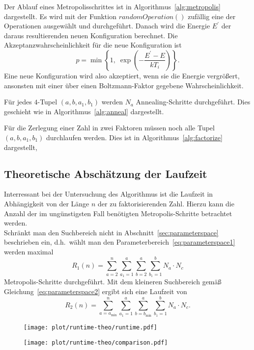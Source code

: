 Der Ablauf eines Metropolisschrittes ist in Algorithmus~\ref{alg:metropolis} dargestellt. Es wird mit der Funktion $\mathrm{\textit{randomOperation}}\left(\right)$ zufällig eine der Operationen ausgewählt und durchgeführt. Danach wird die Energie $E^\prime$ der daraus resultierenden neuen Konfiguration berechnet. Die Akzeptanzwahrscheinlichkeit für die neue Konfiguration ist
\begin{equation*}
		p=\min\left\{1,\;\exp\left(-\frac{E^\prime-E}{k T_i}\right)\right\}.
\end{equation*}
Eine neue Konfiguration wird also akzeptiert, wenn sie die Energie vergrößert, ansonsten mit einer über einen Boltzmann-Faktor gegebene Wahrscheinlichkeit. \\

\FloatBarrier{}

Für jedes $4$-Tupel $\left(a,b,a_1,b_1\right)$ werden $N_a$ Annealing-Schritte durchgeführt. Dies geschieht wie in Algorithmus~\ref{alg:anneal} dargestellt.

\FloatBarrier{}

Für die Zerlegung einer Zahl in zwei Faktoren müssen noch alle Tupel $\left(a,b,a_1,b_1\right)$ durchlaufen werden. Dies ist in Algorithmus~\ref{alg:factorize} dargestellt,

\FloatBarrier{}

\subsection{Theoretische Abschätzung der Laufzeit}\label{sec:runtime-theo}
Interressant bei der Untersuchung des Algorithmus ist die Laufzeit in Abhängigkeit von der Länge $n$ der zu faktorisierenden Zahl. Hierzu kann die Anzahl der im ungünstigsten Fall benötigten Metropolis-Schritte betrachtet werden. \\
Schränkt man den Suchbereich nicht in Abschnitt~\ref{sec:parameterspace} beschrieben ein, d.h.\ wählt man den Parameterbereich~\ref{eq:parameterspace1} werden maximal
\begin{equation*}
		R_1\left(n\right)=\sum\limits_{a=2}^{n}\sum\limits_{a_1=1}^{a}\sum\limits_{b=2}^{a}\sum\limits_{b_1=1}^{b}N_a\cdot N_c
\end{equation*}
Metropolis-Schritte durchgeführt. Mit dem kleineren Suchbereich gemäß Gleichung~\ref{eq:parameterspace2} ergibt sich eine Laufzeit von
\begin{equation*}
		R_2\left(n\right)=\sum\limits_{a=a_\mathrm{min}}^{n}\sum\limits_{a_1=1}^{a}\sum\limits_{b=b_\mathrm{min}}^{a}\sum\limits_{b_1=1}^{b}N_a\cdot N_c.
\end{equation*}
\begin{figure}[ht]
		\centering
		\begin{minipage}[ht]{0.49\linewidth}
				\centering
				\texttt{[image: plot/runtime-theo/runtime.pdf]}
		\end{minipage}
		\begin{minipage}[ht]{0.49\linewidth}
				\centering
				\texttt{[image: plot/runtime-theo/comparison.pdf]}
		\end{minipage}
\end{figure}
\FloatBarrier{}
